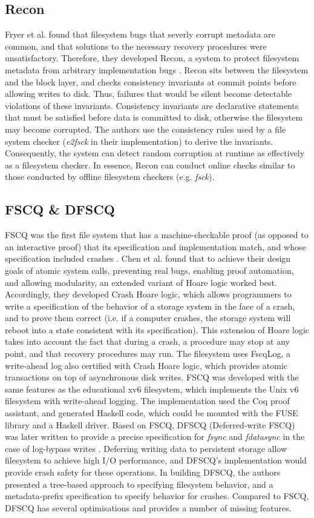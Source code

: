 \subsection{Recon}
Fryer et al. found that filesystem bugs that severly corrupt metadata are common, and that solutions to the necessary recovery procedures were unsatisfactory.
Therefore, they developed Recon, a system to protect filesystem metadata from arbitrary implementation bugs \cite{fryer2012}.
Recon sits between the filesystem and the block layer, and checks consistency invariants at commit points before allowing writes to disk.
Thus, failures that would be silent become detectable violations of these invariants.
Consistency invariants are declarative statements that must be satisfied before data is committed to disk, otherwise the filesystem may become corrupted.
The authors use the consistency rules used by a file system checker (\textit{e2fsck} in their implementation) to derive the invariants.
Consequently, the system can detect random corruption at runtime as effectively as a filesystem checker.
In essence, Recon can conduct online checks similar to those conducted by offline filesystem checkers (e.g. \textit{fsck}).

\subsection{FSCQ \& DFSCQ}
FSCQ was the first file system that has a machine-checkable proof (as opposed to an interactive proof) that its specification and implementation match, and whose specification included crashes \cite{chen2015}.
Chen et al. found that to achieve their design goals of atomic system calls, preventing real bugs, enabling proof automation, and allowing modularity, an extended variant of Hoare logic worked best.
Accordingly, they developed Crash Hoare logic, which allows programmers to write a specification of the behavior of a storage system in the face of a crash, and to prove them correct (i.e. if a computer crashes, the storage system will reboot into a state consistent with its specification).
This extension of Hoare logic takes into account the fact that during a crash, a procedure may stop at any point, and that recovery procedures may run.
The filesystem uses FscqLog, a write-ahead log also certified with Crash Hoare logic, which provides atomic transactions on top of asynchronous disk writes.
FSCQ was developed with the same features as the educational xv6 filesystem, which implements the Unix v6 filesystem with write-ahead logging.
The implementation used the Coq proof assistant, and generated Haskell code, which could be mounted with the FUSE library and a Haskell driver.
Based on FSCQ, DFSCQ (Deferred-write FSCQ) was later written to provide a precise specification for \textit{fsync} and \textit{fdatasync} in the case of log-bypass writes \cite{chen2017}.
Deferring writing data to persistent storage allow filesystem to achieve high I/O performance, and DFSCQ's implementation would provide crash safety for these operations.
In building DFSCQ, the authors presented a tree-based approach to specifying filesystem behavior, and a metadata-prefix specification to specify behavior for crashes.
Compared to FSCQ, DFSCQ has several optimisations and provides a number of missing features.

